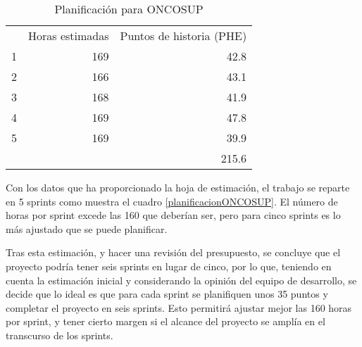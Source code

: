 \begin{table}[h]
\centering
\caption{Planificación para ONCOSUP}
\label{planificacionPHE}
\begin{tabular}{crr}
\rowcolor[HTML]{C0C0C0} 
\multicolumn{1}{l}{\cellcolor[HTML]{C0C0C0}Sprint} & \multicolumn{1}{l}{\cellcolor[HTML]{C0C0C0}Horas estimadas} & \multicolumn{1}{l}{\cellcolor[HTML]{C0C0C0}Puntos de historia (PHE)} \\
1                                                  & 169                                                         & 42.8                                                                 \\
\rowcolor[HTML]{EFEFEF} 
2                                                  & 166                                                         & 43.1                                                                 \\
3                                                  & 168                                                         & 41.9                                                                 \\
\rowcolor[HTML]{EFEFEF} 
4                                                  & 169                                                         & 47.8                                                                 \\
5                                                  & 169                                                         & 39.9                                                                 \\
\multicolumn{1}{l}{}                               & \multicolumn{1}{l}{}                                        & \cellcolor[HTML]{EFEFEF}215.6                                       
\end{tabular}
\end{table}


Con los datos que ha proporcionado la hoja de estimación, el trabajo se reparte en 5 sprints como muestra el cuadro \ref{planificacionONCOSUP}.  El número de horas por sprint excede las 160 que deberían ser, pero para cinco sprints es lo más ajustado que se puede planificar.

Tras esta estimación, y hacer una revisión del presupuesto, se concluye que el proyecto podría tener seis sprints en lugar de cinco, por lo que, teniendo en cuenta la estimación inicial y considerando la opinión del equipo de desarrollo, se decide que lo ideal es que para cada sprint se planifiquen unos 35 puntos y completar el proyecto en seis sprints. Esto permitirá ajustar mejor las 160 horas por sprint, y tener cierto margen si el alcance del proyecto se amplía en el transcurso de los sprints.
